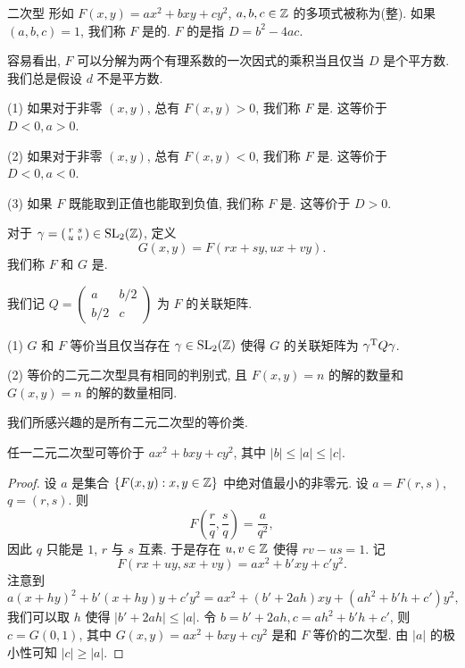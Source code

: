 \begin{definition}{二次型}{}
形如 $F(x,y)=ax^2+bxy+cy^2$, $a,b,c\in{\mathbb{Z}}$ 的多项式被称为(整). 如果 $(a,b,c)=1$, 我们称 $F$ 是的. $F$ 的是指 $D=b^2-4ac$.
\end{definition}


容易看出, $F$ 可以分解为两个有理系数的一次因式的乘积当且仅当 $D$ 是个平方数. 我们总是假设 $d$ 不是平方数.

\begin{definition}{}{}
(1) 如果对于非零 $(x,y)$, 总有 $F(x,y)>0$, 我们称 $F$ 是. 这等价于 $D<0,a>0$.

(2) 如果对于非零 $(x,y)$, 总有 $F(x,y)<0$, 我们称 $F$ 是. 这等价于 $D<0,a<0$.

(3) 如果 $F$ 既能取到正值也能取到负值, 我们称 $F$ 是. 这等价于 $D>0$.
\end{definition}

对于 $\gamma=\left(\begin{smallmatrix}
r&s\\u&v
\end{smallmatrix}\right)
\in{\mathrm{SL}}_2({\mathbb{Z}})$, 定义
	\[G(x,y)=F(rx+sy,ux+vy).\]
我们称 $F$ 和 $G$ 是.

我们记 $Q=\left(\begin{smallmatrix}
a&b/2\\b/2&c
\end{smallmatrix}\right)$ 为 $F$ 的关联矩阵.

\begin{exercise}
(1) $G$ 和 $F$ 等价当且仅当存在 $\gamma\in{\mathrm{SL}}_2({\mathbb{Z}})$ 使得 $G$ 的关联矩阵为 $\gamma^{\mathrm{T}} Q\gamma$.

(2) 等价的二元二次型具有相同的判别式, 且 $F(x,y)=n$ 的解的数量和 $G(x,y)=n$ 的解的数量相同.
\end{exercise}

我们所感兴趣的是所有二元二次型的等价类.

\begin{lemma}{}{}
任一二元二次型可等价于 $ax^2+bxy+cy^2$, 其中 $|b|\le|a|\le |c|$.
\end{lemma}
\begin{proof}
设 $a$ 是集合 $\left\{F(x,y):x,y\in{\mathbb{Z}}\right\}$ 中绝对值最小的非零元. 设 $a=F(r,s)$, $q=(r,s)$. 则
\[F\left(\frac rq,\frac sq\right)=\frac a{q^2},\]
因此 $q$ 只能是 $1$, $r$ 与 $s$ 互素. 于是存在 $u,v\in{\mathbb{Z}}$ 使得 $rv-us=1$. 记
	\[F(rx+uy,sx+vy)=ax^2+b'xy+c' y^2.\]
注意到
	\[a(x+hy)^2+b'(x+hy)y+c'y^2=ax^2+(b'+2ah)xy+(ah^2+b'h+c')y^2,\]
我们可以取 $h$ 使得 $|b'+2ah|\le|a|$. 令 $b=b'+2ah,c=ah^2+b'h+c'$, 则 $c=G(0,1)$, 其中 $G(x,y)=ax^2+bxy+cy^2$ 是和 $F$ 等价的二次型. 由 $|a|$ 的极小性可知 $|c|\ge|a|$.
\end{proof}

